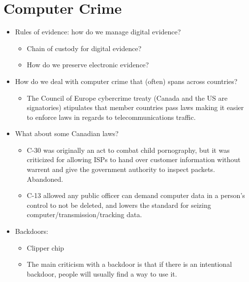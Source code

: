 \documentclass{article}
\begin{document}
\section{Computer Crime}
\begin{itemize}
    \item Rules of evidence: how do we manage digital evidence?
        \begin{itemize}
            \item Chain of custody for digital evidence?
            \item How do we preserve electronic evidence?
        \end{itemize}
    \item How do we deal with computer crime that (often) spans across countries?
        \begin{itemize}
            \item The Council of Europe cybercrime treaty (Canada and the US are signatories) stipulates that member countries pass laws making it easier to enforce laws in regards to telecommunications traffic.
        \end{itemize}
    \item What about some Canadian laws?
        \begin{itemize}
            \item C-30 was originally an act to combat child pornography, but it was criticized for allowing ISPs to hand over customer information without warrent and give the government authority to inspect packets.  Abandoned.
            \item C-13 allowed any public officer can demand computer data in a person's control to not be deleted, and lowers the standard for seizing computer/transmission/tracking data.
        \end{itemize}
    \item Backdoors:
        \begin{itemize}
            \item Clipper chip
            \item The main criticism with a backdoor is that if there is an intentional backdoor, people will usually find a way to use it.
        \end{itemize}
\end{itemize}
\end{document}
